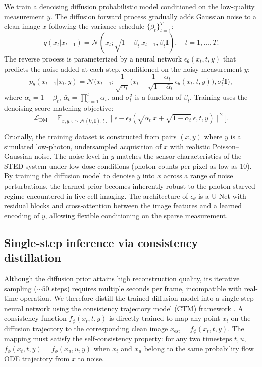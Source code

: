 \documentclass{article}
\begin{document}
We train a denoising diffusion probabilistic model \cite{ho2020denoising} conditioned on the low-quality measurement $y$. The diffusion forward process gradually adds Gaussian noise to a clean image $x$ following the variance schedule $\{\beta_t\}_{t=1}^T$:
\begin{equation}
q(x_t | x_{t-1}) = \mathcal{N}(x_t; \sqrt{1-\beta_t}\, x_{t-1}, \beta_t \mathbf{I}), \quad t = 1,\dots,T.
\end{equation}
The reverse process is parameterized by a neural network $\epsilon_\theta(x_t, t, y)$ that predicts the noise added at each step, conditioned on the noisy measurement $y$:
\begin{equation}
p_\theta(x_{t-1}|x_t, y) = \mathcal{N}\!\big(x_{t-1}; \frac{1}{\sqrt{\alpha_t}}\big(x_t - \frac{1-\alpha_t}{\sqrt{1-\bar\alpha_t}}\epsilon_\theta(x_t,t,y)\big), \sigma_t^2 \mathbf{I}\big),
\end{equation}
where $\alpha_t = 1-\beta_t$, $\bar\alpha_t = \prod_{s=1}^t \alpha_s$, and $\sigma_t^2$ is a function of $\beta_t$. Training uses the denoising score-matching objective:
\begin{equation}
\mathcal{L}_{\mathrm{DM}} = \mathbb{E}_{x,y,\epsilon\sim\mathcal{N}(0,\mathbf{I}),t}\big[ \|\epsilon - \epsilon_\theta(\sqrt{\bar\alpha_t}\,x + \sqrt{1-\bar\alpha_t}\,\epsilon, t, y)\|^2 \big].
\end{equation}

Crucially, the training dataset is constructed from pairs $(x, y)$ where $y$ is a simulated low‑photon, undersampled acquisition of $x$ with realistic Poisson–Gaussian noise. The noise level in $y$ matches the sensor characteristics of the STED system under low‑dose conditions (photon counts per pixel as low as 10). By training the diffusion model to denoise $y$ into $x$ across a range of noise perturbations, the learned prior becomes inherently robust to the photon‑starved regime encountered in live-cell imaging. The architecture of $\epsilon_\theta$ is a U‑Net with residual blocks and cross‑attention between the image features and a learned encoding of $y$, allowing flexible conditioning on the sparse measurement.

\subsection{Single-step inference via consistency distillation}
Although the diffusion prior attains high reconstruction quality, its iterative sampling ($\sim\!50$ steps) requires multiple seconds per frame, incompatible with real-time operation. We therefore distill the trained diffusion model into a single-step neural network using the consistency trajectory model (CTM) framework \cite{song2023consistency}. A consistency function $f_\phi(x_t, t, y)$ is directly trained to map any point $x_t$ on the diffusion trajectory to the corresponding clean image $x_{\mathrm{est}}=f_\phi(x_t, t, y)$. The mapping must satisfy the self‑consistency property: for any two timesteps $t,u$, $f_\phi(x_t, t, y) = f_\phi(x_u, u, y)$ when $x_t$ and $x_u$ belong to the same probability flow ODE trajectory from $x$ to noise.
\end{document}
